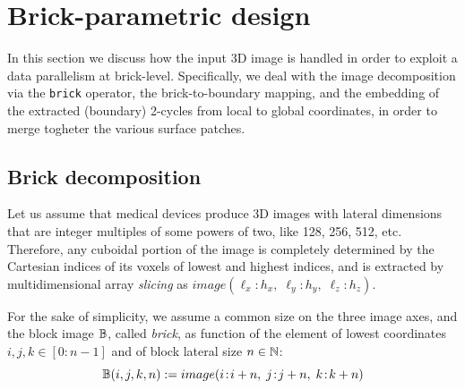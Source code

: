 
\section{Brick-parametric design}\label{sec:filter}

In this section we discuss how the input 3D image is handled in order to exploit a data parallelism at brick-level. Specifically, we deal with the image decomposition via the \texttt{brick} operator, the brick-to-boundary mapping, and the embedding of the extracted (boundary) 2-cycles from local to global coordinates, in order to merge togheter the various surface patches.

\subsection{Brick decomposition}\label{sec:brick-decomposition}

Let us assume that medical devices produce 3D images with lateral dimensions that are integer multiples of some powers of two, like 128, 256, 512, etc.
Therefore, any cuboidal portion of the image is completely determined by the Cartesian indices of its voxels of lowest and highest indices, and is extracted by multidimensional array \emph{slicing} as $image(\ell_x \!:\! h_x,\; \ell_y \!:\! h_y,\; \ell_z \!:\! h_z)$.

For the sake of simplicity, we assume a common size on the three image axes, and the block image $\mathbb{B}$, called \emph{brick}, as function of the element of lowest coordinates $i,j,k\in [0 \!:\! n-1]$ and of block lateral size $n\in\mathbb{N}$:
\[
\mathbb{B}(i,j,k,n) := image(i \!:\! i+n,\; j \!:\! j+n,\; k \!:\! k+n) 
\]

